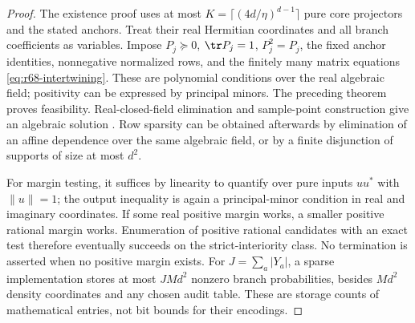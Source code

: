 \begin{proof}
The existence proof uses at most $K=\lceil(4d/\eta)^{d-1}\rceil$ pure core projectors and the stated anchors. Treat their real Hermitian coordinates and all branch coefficients as variables. Impose $P_j\succeq0$, $\tr P_j=1$, $P_j^2=P_j$, the fixed anchor identities, nonnegative normalized rows, and the finitely many matrix equations \eqref{eq:r68-intertwining}. These are polynomial conditions over the real algebraic field; positivity can be expressed by principal minors. The preceding theorem proves feasibility. Real-closed-field elimination and sample-point construction give an algebraic solution \cite{Seidenberg54}. Row sparsity can be obtained afterwards by elimination of an affine dependence over the same algebraic field, or by a finite disjunction of supports of size at most $d^2$.

For margin testing, it suffices by linearity to quantify over pure inputs $uu^*$ with $\|u\|=1$; the output inequality is again a principal-minor condition in real and imaginary coordinates. If some real positive margin works, a smaller positive rational margin works. Enumeration of positive rational candidates with an exact test therefore eventually succeeds on the strict-interiority class. No termination is asserted when no positive margin exists. For $J=\sum_a|Y_a|$, a sparse implementation stores at most $JM d^2$ nonzero branch probabilities, besides $Md^2$ density coordinates and any chosen audit table. These are storage counts of mathematical entries, not bit bounds for their encodings.
\end{proof}

